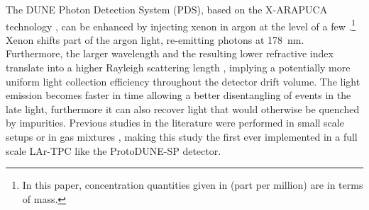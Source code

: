 \documentclass[a4paper]{article}
\begin{document}

The DUNE Photon Detection System (PDS), based on the X-ARAPUCA technology \cite{AbiIV_2020}, can be enhanced by injecting xenon in argon at the level of a few \si{\ppm}.\footnote{In this paper, concentration quantities given in \si{\ppm} (part per million) are in terms of mass.} Xenon shifts part of the argon light, re-emitting photons at \SI{178}{\nano\meter}. Furthermore, the larger wavelength and the resulting lower refractive index translate into a higher Rayleigh scattering length \cite{argongroupspeed}, implying a potentially more uniform light collection efficiency throughout the detector drift volume. The light emission becomes faster in time allowing a better disentangling of events in the late light, furthermore it can also recover light that would otherwise be quenched by impurities. Previous studies in the literature were performed in small scale setups or in gas mixtures \cite{SUZUKI199367, Wahl:2014vma}, making this study the first ever implemented in a full scale LAr-TPC like the ProtoDUNE-SP detector.
\end{document}
